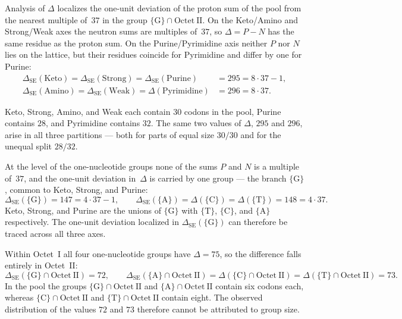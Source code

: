 \documentclass[11pt,a4paper]{article}
\renewcommand{\_}{\origunderscore\allowbreak}
\begin{document}
Analysis of $\Delta$ localizes the one-unit deviation of the proton sum
of the pool from the nearest multiple of~$37$ in the group $\{\mathrm{G}\}
\cap \mathrm{Octet~II}$. On the Keto/Amino and Strong/Weak axes the
neutron sums are multiples of~$37$, so $\Delta = P - N$ has the same
residue as the proton sum. On the Purine/Pyrimidine axis neither $P$ nor
$N$ lies on the lattice, but their residues coincide for Pyrimidine and
differ by one for Purine:
\[
\begin{aligned}
\Delta_{\mathrm{SE}}(\mathrm{Keto}) = \Delta_{\mathrm{SE}}(\mathrm{Strong})
  = \Delta_{\mathrm{SE}}(\mathrm{Purine})
  &= 295 = 8 \cdot 37 - 1, \\
\Delta_{\mathrm{SE}}(\mathrm{Amino}) = \Delta_{\mathrm{SE}}(\mathrm{Weak})
  = \Delta(\mathrm{Pyrimidine})
  &= 296 = 8 \cdot 37.
\end{aligned}
\]

Keto, Strong, Amino, and Weak each contain $30$ codons in the pool, Purine
contains $28$, and Pyrimidine contains $32$. The same two values of
$\Delta$, $295$ and $296$, arise in all three partitions --- both for
parts of equal size $30/30$ and for the unequal split $28/32$.

At the level of the one-nucleotide groups none of the sums $P$ and $N$ is
a multiple of~$37$, and the one-unit deviation in~$\Delta$ is carried by one group
--- the branch $\{\mathrm{G}\}$, common to Keto, Strong, and Purine:
\[
\Delta_{\mathrm{SE}}(\{\mathrm{G}\}) = 147 = 4 \cdot 37 - 1,
\qquad
\Delta_{\mathrm{SE}}(\{\mathrm{A}\}) =
\Delta(\{\mathrm{C}\}) =
\Delta(\{\mathrm{T}\}) = 148 = 4 \cdot 37.
\]
Keto, Strong, and Purine are the unions of $\{\mathrm{G}\}$ with
$\{\mathrm{T}\}$, $\{\mathrm{C}\}$, and $\{\mathrm{A}\}$ respectively. The
one-unit deviation localized in $\Delta_{\mathrm{SE}}(\{\mathrm{G}\})$
can therefore be traced across all three axes.

Within Octet~I all four one-nucleotide groups have $\Delta = 75$, so
the difference falls entirely in Octet~II:
\[
\Delta_{\mathrm{SE}}(\{\mathrm{G}\} \cap \mathrm{Octet~II}) = 72,
\qquad
\Delta_{\mathrm{SE}}(\{\mathrm{A}\} \cap \mathrm{Octet~II}) =
\Delta(\{\mathrm{C}\} \cap \mathrm{Octet~II}) =
\Delta(\{\mathrm{T}\} \cap \mathrm{Octet~II}) = 73.
\]
In the pool the groups $\{\mathrm{G}\} \cap \mathrm{Octet~II}$ and
$\{\mathrm{A}\} \cap \mathrm{Octet~II}$ contain six codons each, whereas
$\{\mathrm{C}\} \cap \mathrm{Octet~II}$ and $\{\mathrm{T}\} \cap
\mathrm{Octet~II}$ contain eight. The observed distribution of the values
$72$ and $73$ therefore cannot be attributed to group size.
\end{document}
